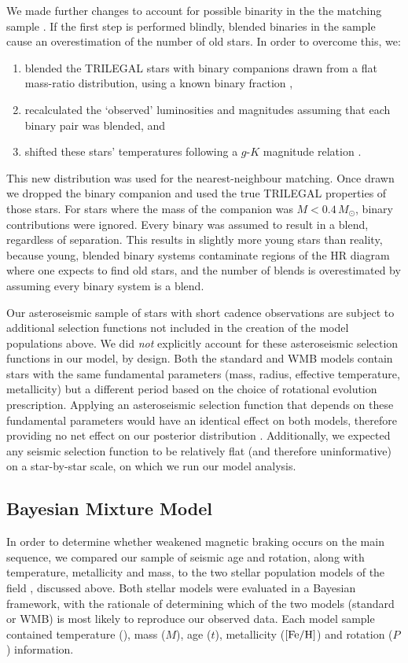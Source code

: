We made further changes to account for possible binarity in the the matching sample \cite{m_berger+2020}. If the first step is performed blindly, blended binaries in the sample cause an overestimation of the number of old stars. In order to overcome this, we:

\begin{enumerate}
	\item blended the TRILEGAL stars with binary companions drawn from a flat mass-ratio distribution, using a known binary fraction \cite{m_raghavan+2010},
	\item recalculated the `observed' luminosities and magnitudes assuming that each binary pair was blended, and
	\item shifted these stars' temperatures following a $g$-$K$ magnitude relation \cite{m_berger+2020}.
\end{enumerate}

This new distribution was used for the nearest-neighbour matching. Once drawn we dropped the binary companion and used the true TRILEGAL properties of those stars. For stars where the mass of the companion was $M < 0.4\, M_\odot$, binary contributions were ignored. Every binary was assumed to result in a blend, regardless of separation. This results in slightly more young stars than reality, because young, blended binary systems contaminate regions of the HR diagram where one expects to find old stars, and the number of blends is overestimated by assuming every binary system is a blend.

Our asteroseismic sample of stars with short cadence observations are subject to additional selection functions not included in the creation of the model populations above. We did \textit{not} explicitly account for these asteroseismic selection functions in our model, by design. Both the standard and WMB models contain stars with the same fundamental parameters (mass, radius, effective temperature, metallicity) but a different period based on the choice of rotational evolution prescription. Applying an asteroseismic selection function that depends on these fundamental parameters would have an identical effect on both models, therefore providing no net effect on our posterior distribution \cite{m_chaplin+2011}.  Additionally, we expected any seismic selection function to be relatively flat (and therefore uninformative) on a star-by-star scale, on which we run our model analysis. 

\subsection{Bayesian Mixture Model}
In order to determine whether weakened magnetic braking occurs on the main sequence, we compared our sample of seismic age and rotation, along with temperature, metallicity and mass, to the two stellar population models of the \kepler field \cite{m_vansaders+2019}, discussed above. Both stellar models were evaluated in a Bayesian framework, with the rationale of determining which of the two models (standard or WMB) is most likely to reproduce our observed data. Each model sample contained temperature (\teff), mass ($M$), age ($t$), metallicity ($\rm{[Fe/H]}$) and rotation ($P$) information.

